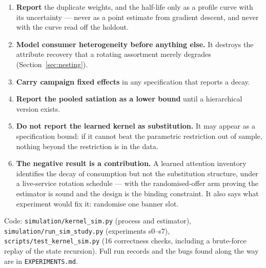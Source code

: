 \documentclass[11pt]{article}
\begin{document}
\begin{enumerate}
\item \textbf{Report} the duplicate weights, and the half-life only as a profile
curve with its uncertainty --- never as a point estimate from gradient descent,
and never with the curve read off the holdout.
\item \textbf{Model consumer heterogeneity before anything else.} It destroys
the attribute recovery that a rotating assortment merely degrades
(Section~\ref{sec:nesting}).
\item \textbf{Carry campaign fixed effects} in any specification that reports a
decay.
\item \textbf{Report the pooled satiation as a lower bound} until a hierarchical
version exists.
\item \textbf{Do not report the learned kernel as substitution.} It may appear
as a specification bound: if it cannot beat the parametric restriction out of
sample, nothing beyond the restriction is in the data.
\item \textbf{The negative result is a contribution.} A learned attention
inventory identifies the decay of consumption but not the substitution
structure, under a live-service rotation schedule --- with the randomised-offer
arm proving the estimator is sound and the design is the binding constraint.
It also says what experiment would fix it: randomise one banner slot.
\end{enumerate}

\vspace{1em}
\noindent\footnotesize Code: \texttt{simulation/kernel\_sim.py} (process and
estimator), \texttt{simulation/run\_sim\_study.py} (experiments s0--s7),
\texttt{scripts/test\_kernel\_sim.py} (16 correctness checks, including a
brute-force replay of the state recursion). Full run records and the bugs found
along the way are in \texttt{EXPERIMENTS.md}.
\end{document}
